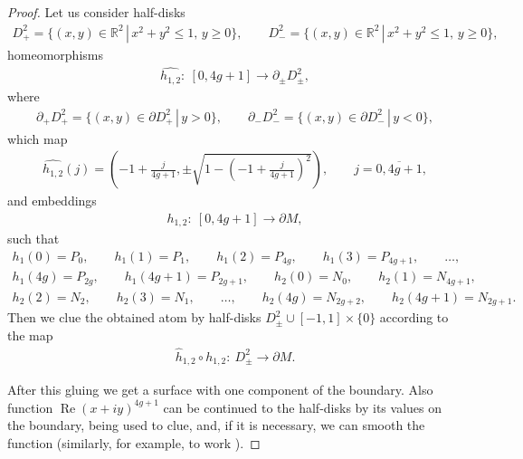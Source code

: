 \documentclass[10pt,a4paper]{amsart}
\numberwithin{equation}{section}
\begin{document}
\begin{proof}
Let us consider half-disks
\begin{gather*}
D^{2}_{+}=\big\{(x,y)\in{\mathbb R}^{2} \,|\, x^{2}+y^{2}\leq1, \,y\geq0\big\}, \qquad
D^{2}_{-}=\big\{(x,y)\in{\mathbb R}^2 \,|\, x^{2}+y^{2}\leq1,\, y\geq0\big\},
\end{gather*}
homeomorphisms
\begin{gather*}
\widehat{h_{1,2}}\colon \ [0,4g+1]\rightarrow \partial_{\pm}D^{2}_{\pm},
\end{gather*}
where
\begin{gather*}
\partial_{+}D^{2}_{+}=\big\{(x,y)\in\partial D^{2}_{+}\,|\,y>0\big \}, \qquad
\partial_{-}D^{2}_{-}=\big\{(x,y)\in\partial D^{2}_{-}\,|\,y<0\},
\end{gather*}
which map
\begin{gather*}
\widehat{h_{1,2}}(j)=\left(-1+\frac{j}{4g+1},\pm\sqrt{1-(-1+\frac{j}{4g+1})^{2}}\right),\qquad j=\overline{0,4g+1},
\end{gather*}
and embeddings
\begin{gather*}
h_{1,2}\colon \ [0,4g+1] \rightarrow \partial M,
\end{gather*}
such that
\begin{gather*}
h_{1}(0)=P_{0}, \qquad h_{1}(1)=P_{1}, \qquad h_{1}(2)=P_{4g}, \qquad h_{1}(3)=P_{4g+1}, \qquad \ldots, \\
h_{1}(4g)=P_{2g}, \qquad h_{1}(4g+1)=P_{2g+1}, \qquad h_{2}(0)=N_{0}, \qquad h_{2}(1)=N_{4g+1},\\
h_{2}(2)=N_{2}, \qquad h_{2}(3)=N_{1}, \qquad \ldots, \qquad h_{2}(4g)=N_{2g+2}, \qquad h_{2}(4g+1)=N_{2g+1}.
\end{gather*}
Then we clue the obtained atom by half-disks $D^{2}_{\pm}\cup[-1,1]\times\{0\}$ according to the map
\begin{gather*}
\widehat{h}_{1,2} \circ h_{1,2}\colon \ D^{2}_{\pm} \rightarrow \partial M.
\end{gather*}

After this gluing we get a surface with one component of the boundary. Also function $\operatorname{Re}(x+iy)^{4g+1}$ can be continued to the half-disks by its values on the boundary, being used to clue, and, if it is necessary, we can smooth the function (similarly, for example, to work \cite[Section~5]{Konner/Floid}).


\end{proof}
\end{document}
